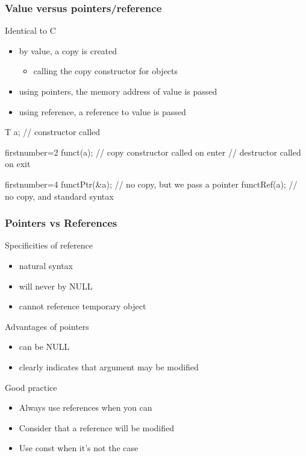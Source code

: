 \begin{frame}[fragile]
  \frametitle{Value versus pointers/reference}
  \begin{block}{Identical to C}
    \begin{itemize}
    \item by value, a copy is created
      \begin{itemize}
        \item calling the copy constructor for objects
      \end{itemize}
    \item using pointers, the memory address of value is passed
    \item using reference, a reference to value is passed
    \end{itemize}
  \end{block}
  \begin{cppcode}
    T a;      // constructor called
  \end{cppcode}
  \pause
  \begin{cppcode*}{firstnumber=2}
    funct(a); // copy constructor called on enter
              // destructor called on exit
  \end{cppcode*}
  \pause
  \begin{cppcode*}{firstnumber=4}
    functPtr(&a); // no copy, but we pass a pointer
    functRef(a);  // no copy, and standard syntax
  \end{cppcode*}
\end{frame}


\begin{frame}[fragile]
  \frametitle{Pointers vs References}
  \begin{block}{Specificities of reference}
    \begin{itemize}
    \item natural syntax
    \item will never by NULL
    \item cannot reference temporary object
    \end{itemize}
  \end{block}
  \begin{block}{Advantages of pointers}
    \begin{itemize}
    \item can be NULL
    \item clearly indicates that argument may be modified
    \end{itemize}
  \end{block}
  \pause
  \begin{alertblock}{Good practice}
    \begin{itemize}
      \item Always use references when you can
      \item Consider that a reference will be modified
      \item Use const when it's not the case
    \end{itemize}
  \end{alertblock}
\end{frame}

